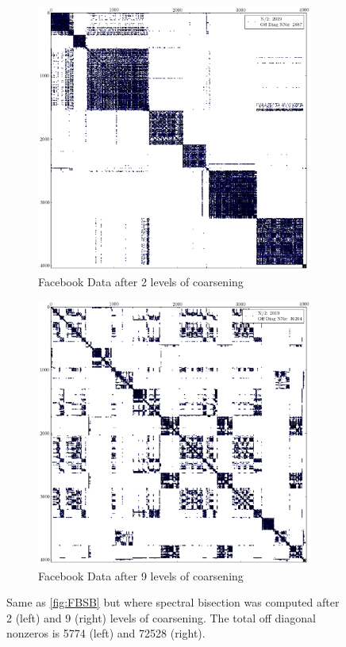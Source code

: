 \documentclass[11pt]{article}
\begin{document}
\begin{figure}
\centering
\begin{subfigure}{.5\textwidth}
	\centering
	\includegraphics[width=.9\linewidth]{figs/Facebook_c2.png}
	\caption{Facebook Data after 2 levels of coarsening}
	\label{fig:FB2}
\end{subfigure}%
\begin{subfigure}{.5\textwidth}
		\centering
		\includegraphics[width=.9\linewidth]{figs/Facebook_c9.png}
		\caption{Facebook Data after 9 levels of coarsening}
		\label{fig:FB9}
	\end{subfigure}
	\caption{ Same as \ref{fig:FBSB} but where spectral bisection was
computed after 2 (left) and 9 (right) levels of coarsening. The total off
diagonal nonzeros is 5774 (left) and 72528 (right). } 
	\label{fig:coarseFB}
\end{figure}
\end{document}
